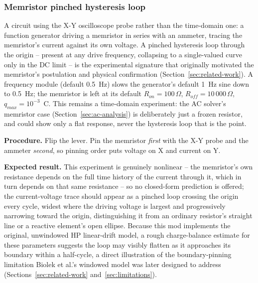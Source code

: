 \subsubsection{Memristor pinched hysteresis loop}
\label{sec:exp-memristor}

A circuit using the X-Y oscilloscope probe rather than the time-domain one: a function
generator driving a memristor in series with an ammeter, tracing the memristor's current
against its own voltage. A pinched hysteresis loop through the origin -- present at any drive
frequency, collapsing to a single-valued curve only in the DC limit -- is the experimental
signature that originally motivated the memristor's postulation and physical confirmation
(Section~\ref{sec:related-work}). A frequency module (default 0.5~Hz) slows the generator's
default 1~Hz sine down to 0.5~Hz; the memristor is left at its default $R_{on}=100\,\Omega$,
$R_{off}=10\,000\,\Omega$, $q_{max}=10^{-3}$~C. This remains a time-domain experiment: the AC
solver's memristor case (Section~\ref{sec:ac-analysis}) is deliberately just a frozen
resistor, and could show only a flat response, never the hysteresis loop that is the point.

\textbf{Procedure.} Flip the lever. Pin the memristor \emph{first} with the X-Y probe and the
ammeter \emph{second}, so pinning order puts voltage on X and current on Y.

\textbf{Expected result.} This experiment is genuinely nonlinear -- the memristor's own
resistance depends on the full time history of the current through it, which in turn depends
on that same resistance -- so no closed-form prediction is offered; the current-voltage trace
should appear as a pinched loop crossing the origin every cycle, widest where the driving
voltage is largest and progressively narrowing toward the origin, distinguishing it from an
ordinary resistor's straight line or a reactive element's open ellipse. Because this mod
implements the original, unwindowed HP linear-drift model, a rough charge-balance estimate
for these parameters suggests the loop may visibly flatten as it approaches its boundary
within a half-cycle, a direct illustration of the boundary-pinning limitation Biolek et al.'s
windowed model was later designed to address (Sections~\ref{sec:related-work}
and~\ref{sec:limitations}).

